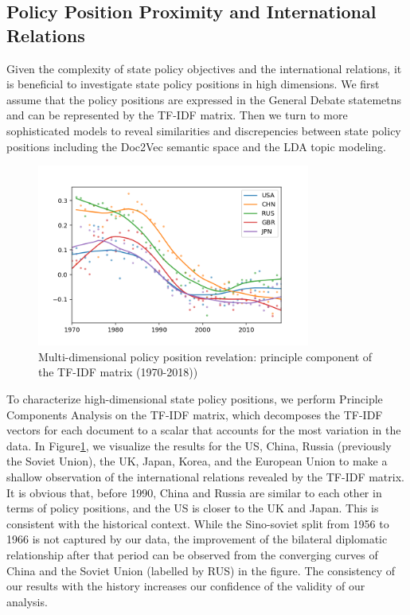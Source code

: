 \documentclass[final,authoryear,3p,12pt,times,hidelinks]{elsarticle}
\begin{document}
\subsection{Policy Position Proximity and International Relations}

Given the complexity of state policy objectives and the international relations, it is beneficial to investigate state policy positions in high dimensions. We first assume that the policy positions are expressed in the General Debate statemetns and can be represented by the TF-IDF matrix. Then we turn to more sophisticated models to reveal similarities and discrepencies between state policy positions including the Doc2Vec semantic space and the LDA topic modeling. 

\begin{figure}[ht!]
  \begin{center}
    \includegraphics[width=0.8\textwidth]{graphs/tfidf_pca_1.png}
    \caption{Multi-dimensional policy position revelation: principle component of the TF-IDF matrix (1970-2018))}
    \label{fig:tfidf pca 1}
  \end{center}
\end{figure}

To characterize high-dimensional state policy positions, we perform Principle Components Analysis on the TF-IDF matrix, which decomposes the TF-IDF vectors for each document to a scalar that accounts for the most variation in the data. In Figure\ref{fig:tfidf pca 1}, we visualize the results for the US, China, Russia (previously the Soviet Union), the UK, Japan, Korea, and the European Union to make a shallow observation of the international relations revealed by the TF-IDF matrix. It is obvious that, before 1990, China and Russia are similar to each other in terms of policy positions, and the US is closer to the UK and Japan. This is consistent with the historical context. While the Sino-soviet split from 1956 to 1966 is not captured by our data, the improvement of the bilateral diplomatic relationship after that period can be observed from the converging curves of China and the Soviet Union (labelled by RUS) in the figure. The consistency of our results with the history increases our confidence of the validity of our analysis. 
\end{document}

